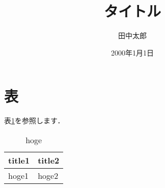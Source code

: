 \documentclass[a4paper,10pt]{jsarticle}
\title{タイトル}%
\author{田中太郎}%
\date{2000年1月1日}%
\begin{document}
\maketitle%

\section{表}
表\ref{tb:hoge}を参照します．
\begin{table}[H]
    \caption{hoge}
    \label{tb:hoge}
    \centering
    \begin{tabular}{ll}
        \hline
        title1 & title2 \\
        \hline \hline
        hoge1 & hoge2 \\
        \hline
    \end{tabular}
\end{table}
\end{document}

